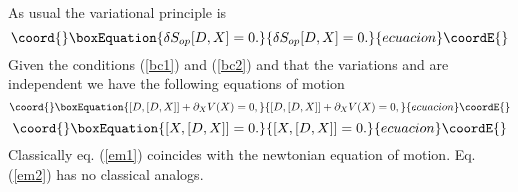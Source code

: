 \documentclass[a4paper,11pt]{article}
\begin{document}
As usual the variational principle is
\begin{equation}\coord{}\boxEquation{
\delta S_{op}[D,X]=0.
}{
\delta S_{op}[D,X]=0.
}{ecuacion}\coordE{}\end{equation}
Given the conditions (\ref{bc1}) and (\ref{bc2}) and that the
variations \coordHE{} and \coordHE{} are independent we have the
following equations of motion
\begin{equation}\coord{}\boxEquation{
[D,[D,X]] + \partial_X V(X)=0, \label{em1}
}{
[D,[D,X]] + \partial_X V(X)=0, }{ecuacion}\coordE{}\end{equation}
\begin{equation}\coord{}\boxEquation{
[X,[D,X]]=0. \label{em2}
}{
[X,[D,X]]=0. }{ecuacion}\coordE{}\end{equation}
Classically eq. (\ref{em1}) coincides with the newtonian equation
of motion. Eq. (\ref{em2}) has no classical analogs.
\end{document}
